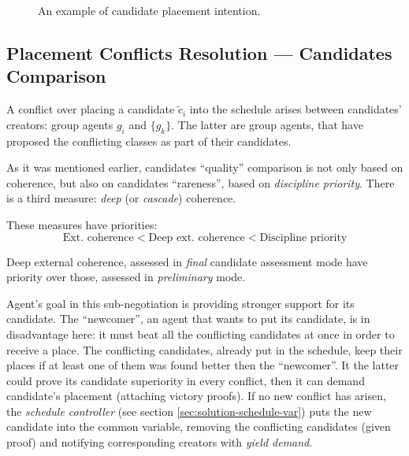 \documentclass[../../ThesisDoc]{subfiles}
\begin{document}

\begin{figure}[h]
  \centering
  
  \caption{ An example of candidate placement intention. }
  \label{fig:candidate-conflict}
\end{figure}


\subsection{Placement Conflicts Resolution --- Candidates Comparison}
\label{sec:solution-compare}

A conflict over placing a candidate $\tilde{c}_i$ into the schedule arises
between candidates' creators: group agents $g_i$ and $\{g_k\}$.
The latter are group agents, that have proposed the conflicting classes
as part of their candidates.

As it was mentioned earlier, candidates ``quality'' comparison is not only based
on coherence, but also on candidates ``rareness'', based on \emph{discipline priority}.
There is a third measure: \emph{deep} (or \emph{cascade}) coherence.

\medskip
\noindent
These measures have priorities:
$$ \text{Ext. coherence} < \text{Deep ext. coherence} < \text{Discipline priority} $$

\medskip
\noindent
Deep external coherence, assessed in \emph{final} candidate assessment mode
have priority over those, assessed in \emph{preliminary} mode.

\bigskip
\noindent
Agent's goal in this sub-negotiation is providing stronger support for its
candidate. The ``newcomer'', an agent that wants to put its candidate, is
in disadvantage here: it must beat all the conflicting candidates at once in
order to receive a place. The conflicting candidates, already put in the schedule,
keep their places if at least one of them was found better then the ``newcomer''.
It the latter could prove its candidate superiority in every conflict, then
it can demand candidate's placement (attaching victory proofs).
If no new conflict has arisen, the \emph{schedule controller}
(see section \ref{sec:solution-schedule-var}) puts the new candidate into the
common variable, removing the conflicting candidates (given proof) and notifying
corresponding creators with \emph{yield demand}.
\end{document}

